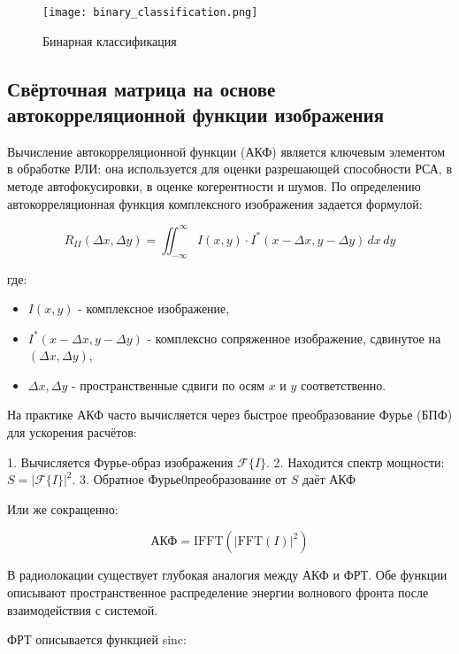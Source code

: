 \begin{figure}[ht]
    \centering
    \texttt{[image: binary\_classification.png]}
    \caption{Бинарная классификация}
    \label{fig:binary_classification}
\end{figure}

\subsection{Свёрточная матрица на основе автокорреляционной функции изображения}

	Вычисление автокорреляционной функции (АКФ) является ключевым элементом в обработке РЛИ: она используется для оценки разрешающей способности РСА, в методе автофокусировки, в оценке когерентности и шумов. По определению автокорреляционная функция комплексного изображения задается формулой:
	
\begin{equation}
    R_{II}(\Delta x, \Delta y) = \iint_{-\infty}^{\infty} I(x, y) \cdot I^*(x - \Delta x, y - \Delta y) \, dx \, dy
\end{equation}

где:
\begin{itemize}
	\item $I(x, y)$ - комплексное изображение,
	\item $I^*(x - \Delta x, y - \Delta y)$ - комплексно сопряженное изображение, сдвинутое на $(\Delta x, \Delta y)$,
	\item $\Delta x, \Delta y$ - пространственные сдвиги по осям $x$ и $y$ соответственно.
\end{itemize}

	На практике АКФ часто вычисляется через быстрое преобразование Фурье (БПФ) для ускорения расчётов:

	1. Вычисляется Фурье-образ изображения \(\mathcal{F}\{I\}\).
	2. Находится спектр мощности: \(S = |\mathcal{F}\{I\}|^2\).
	3. Обратное Фурье0преобразование от \(S\) даёт АКФ
	
	Или же сокращенно:
	
\begin{equation}
    \text{АКФ} = \mathrm{IFFT}(|\mathrm{FFT}(I)|^2)
\end{equation}	

	В радиолокации существует глубокая аналогия между АКФ и ФРТ. Обе функции описывают пространственное распределение энергии волнового фронта после взаимодействия с системой.
	
	ФРТ описывается функцией sinc:
	
